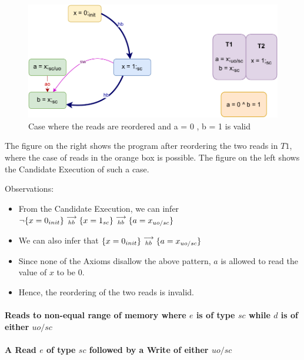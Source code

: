         \begin{figure}[H]
            \centering
            \includegraphics[scale=0.7]{InstructionReordering/Example1R(Rsc-Ruo,sc).pdf}
            \caption{Case where the reads are reordered and a = 0 , b = 1 is valid}
        \end{figure}

        The figure on the right shows the program after reordering the two reads in $T1$, where the case of reads in the orange box is possible. 
        The figure on the left shows the Candidate Execution of such a case. 

        Observations:
        \begin{itemize}
            \item From the Candidate Execution, we can infer $\neg\{x=0_{init}\}\stackrel{\longrightarrow}{_{hb}}\{x=1_{sc}\}\stackrel{\longrightarrow}{_{hb}}\{a=x_{uo/sc}\}$
            \item We can also infer that $\{x=0_{init}\}\stackrel{\longrightarrow}{_{hb}}\{a=x_{uo/sc}\}$    
            \item Since none of the Axioms disallow the above pattern, $a$ is allowed to read the value of $x$ to be $0$.
            \item Hence, the reordering of the two reads is invalid. 
        \end{itemize}
    \paragraph{Reads to non-equal range  of memory where $e$ is of type $sc$ while $d$ is of either $uo/sc$}

    \paragraph{A Read $e$ of type $sc$ followed by a Write of either $uo/sc$}
        
